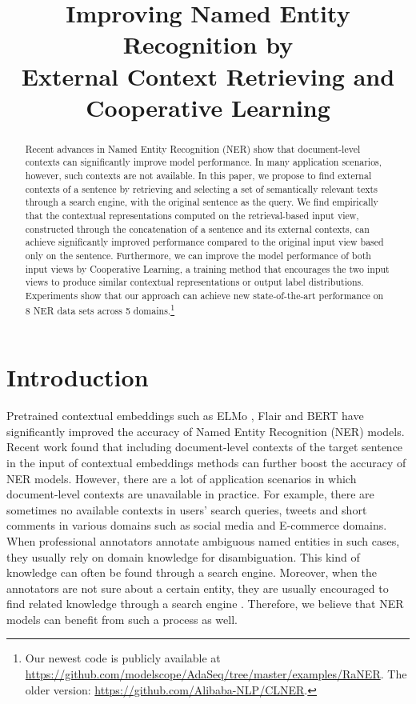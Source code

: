 \title{Improving Named Entity Recognition by \\ External Context Retrieving and Cooperative Learning}



\maketitle
\begin{abstract}

Recent advances in Named Entity Recognition (NER) show that document-level contexts can significantly improve model performance. In many application scenarios, however, such contexts are not available. In this paper, we propose to find external contexts of a sentence by retrieving and selecting a set of semantically relevant texts through a search engine, with the original sentence as the query. We find empirically that the contextual representations computed on the retrieval-based input view, constructed through the concatenation of a sentence and its external contexts, can achieve significantly improved performance compared to the original input view based only on the sentence. Furthermore, we can improve the model performance of both input views by Cooperative Learning, a training method that encourages the two input views to produce similar contextual representations or output label distributions. Experiments show that our approach can achieve new state-of-the-art performance on 8 NER data sets across 5 domains.\footnote{Our newest code is publicly available at \url{https://github.com/modelscope/AdaSeq/tree/master/examples/RaNER}. The older version: \url{https://github.com/Alibaba-NLP/CLNER}.}

\end{abstract}

\section{Introduction}
Pretrained contextual embeddings such as ELMo \citep{peters-etal-2018-deep}, Flair \citep{akbik-etal-2018-contextual} and BERT \citep{devlin-etal-2019-bert} have significantly improved the accuracy of Named Entity Recognition (NER) models. Recent work \citep{devlin-etal-2019-bert,yu-etal-2020-named,yamada-etal-2020-luke} found that including document-level contexts of the target sentence in the input of contextual embeddings methods can further boost the accuracy of NER models. 
However, there are a lot of application scenarios in which document-level contexts are unavailable in practice. For example, there are sometimes no available contexts in users' search queries, tweets and short comments in various domains such as social media and E-commerce domains. When professional annotators annotate ambiguous named entities in such cases, they usually rely on domain knowledge for disambiguation. This kind of knowledge can often be found through a search engine. Moreover, when the annotators are not sure about a certain entity, they are usually encouraged to find related knowledge through a search engine \citep{wang-etal-2019-crossweigh}. Therefore, we believe that NER models can benefit from such a process as well. 

